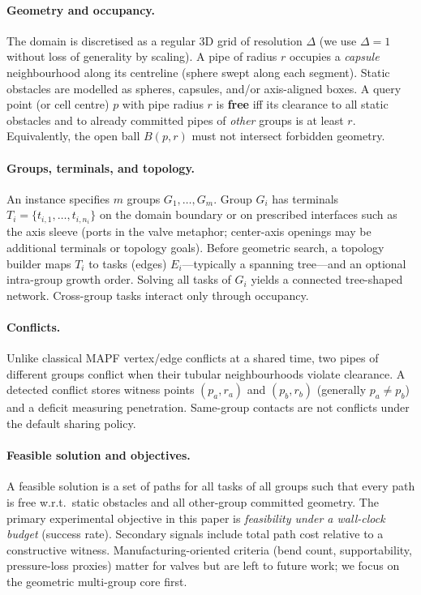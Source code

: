 \paragraph{Geometry and occupancy.}
The domain is discretised as a regular 3D grid of resolution $\Delta$
(we use $\Delta{=}1$ without loss of generality by scaling).
A pipe of radius $r$ occupies a \emph{capsule} neighbourhood along its
centreline (sphere swept along each segment). Static obstacles are modelled as
spheres, capsules, and/or axis-aligned boxes.
A query point (or cell centre) $p$ with pipe radius $r$ is \textbf{free} iff
its clearance to all static obstacles and to already committed pipes of
\emph{other} groups is at least $r$. Equivalently, the open ball $B(p,r)$ must
not intersect forbidden geometry.

\paragraph{Groups, terminals, and topology.}
An instance specifies $m$ groups $G_1,\ldots,G_m$. Group $G_i$ has terminals
$T_i=\{t_{i,1},\ldots,t_{i,n_i}\}$ on the domain boundary or on prescribed
interfaces such as the axis sleeve (ports in the valve metaphor; center-axis
openings may be additional terminals or topology goals).
Before geometric search, a topology builder maps $T_i$ to tasks (edges)
$E_i$---typically a spanning tree---and an optional intra-group growth order.
Solving all tasks of $G_i$ yields a connected tree-shaped network.
Cross-group tasks interact only through occupancy.

\paragraph{Conflicts.}
Unlike classical MAPF vertex/edge conflicts at a shared time, two pipes of
different groups conflict when their tubular neighbourhoods violate clearance.
A detected conflict stores witness points $(p_a,r_a)$ and $(p_b,r_b)$
(generally $p_a\neq p_b$) and a deficit measuring penetration.
Same-group contacts are not conflicts under the default sharing policy.

\paragraph{Feasible solution and objectives.}
A feasible solution is a set of paths for all tasks of all groups such that
every path is free w.r.t.\ static obstacles and all other-group committed
geometry.
The primary experimental objective in this paper is \emph{feasibility under a
wall-clock budget} (success rate). Secondary signals include total path cost
relative to a constructive witness.
Manufacturing-oriented criteria (bend count, supportability, pressure-loss
proxies) matter for valves but are left to future work; we focus on the
geometric multi-group core first.

